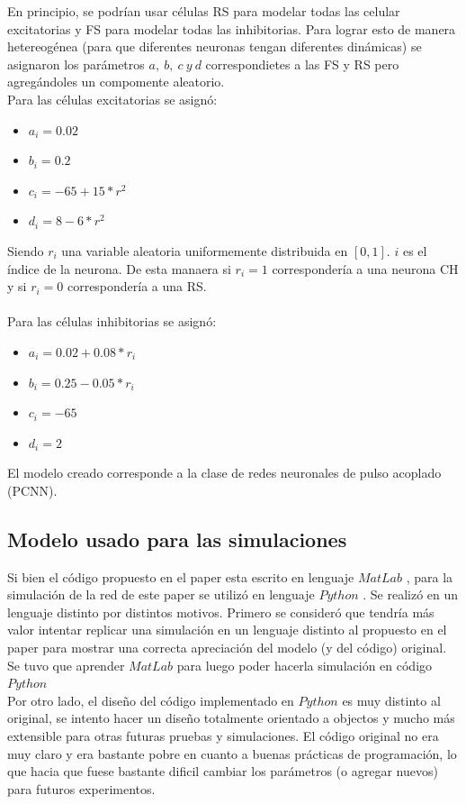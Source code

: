 \documentclass[12pt]{article}
\begin{document}
En principio, se podrían usar células RS para modelar todas las celular excitatorias y FS para modelar todas las inhibitorias. Para lograr esto de manera hetereogénea (para que diferentes neuronas tengan diferentes dinámicas)
se asignaron los parámetros $a, \ b, \ c \ y \ d$ correspondietes a las FS y RS pero agregándoles un compomente aleatorio. \\
Para las células excitatorias se asignó:
\begin{itemize}
    \item $a_i = 0.02$
    \item $b_i = 0.2$
    \item $c_i = -65 + 15 * r^2$
    \item $d_i = 8 - 6 * r^2$
\end{itemize}

Siendo $r_i$ una variable aleatoria uniformemente distribuida en $[0,1 ]$. $i$ es el índice de la neurona. De esta manaera si $r_i = 1$ correspondería a una neurona CH y si $r_i = 0$ correspondería a una RS.\\
\\
Para las células inhibitorias se asignó:
\begin{itemize}
    \item $a_i = 0.02 + 0.08 * r_i$
    \item $b_i = 0.25 - 0.05 * r_i$
    \item $c_i = -65$
    \item $d_i = 2$
\end{itemize}

El modelo creado corresponde a la clase de redes neuronales de pulso acoplado (PCNN).
\newpage
\subsection{Modelo usado para las simulaciones}
Si bien el código propuesto en el paper esta escrito en lenguaje $MatLab$ \cite{MatLab}, para la simulación de la red de este paper se utilizó en lenguaje $Python$ \cite{Python}.
Se realizó en un lenguaje distinto por distintos motivos. Primero se consideró que tendría más valor intentar replicar una simulación en un lenguaje distinto al propuesto en el paper
para mostrar una correcta apreciación del modelo (y del código) original. Se tuvo que aprender $MatLab$ para luego poder hacerla simulación en código $Python$ \\
Por otro lado, el diseño del código implementado en $Python$ es muy distinto al original, se intento hacer un diseño totalmente orientado a objectos y mucho más extensible para otras futuras pruebas y simulaciones.
El código original no era muy claro y era bastante pobre en cuanto a buenas prácticas de programación, lo que hacia que fuese bastante dificil cambiar los parámetros (o agregar nuevos) para futuros experimentos.
\end{document}
